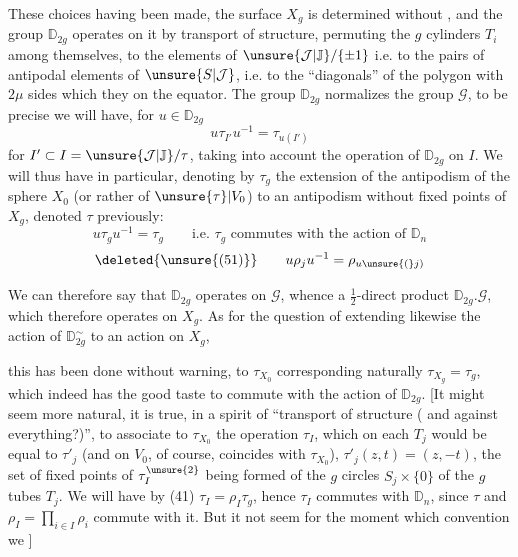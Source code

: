 These choices having been made, the surface $X_g$ is determined without
, and the group $\mathbb D_{2g}$ operates on it by transport of
structure, permuting the $g$ cylinders $T_i$ among themselves,
 to the elements of
$\unsure{\mathcal J|\mathbb J}/\{\pm1\}$ i.e.
to the pairs of antipodal elements of $\unsure{S|\mathcal J}$,
i.e. to the ``diagonals'' of the polygon with $2\mu$ sides
which they 
on the equator. The group $\mathbb D_{2g}$ normalizes
 the group $\mathcal G$, to be precise
we will have, for $u\in\mathbb D_{2g}$
\[
\tag{49}
u\tau_{I'}u^{-1}=\tau_{u(I')}
\]
for $I'\subset I=\unsure{\mathcal J|\mathbb J}/\tau$, taking into account
the operation of $\mathbb D_{2g}$ on $I$. We will thus have in
particular, denoting by $\tau_g$\inserted{$=\tau_\varnothing$}
the extension  of the antipodism of the sphere $X_0$
(or rather of $\unsure{\tau}\vert V_0$) to an antipodism
without fixed points of $X_g$, denoted $\tau$ previously:
\[
\tag{50}
u\tau_g u^{-1}=\tau_g
\qquad\text{i.e. $\tau_g$ commutes with the action of $\mathbb D_n$}
\]
\[
\deleted{\unsure{(51)}}\qquad
u\rho_j u^{-1}=\rho_{u\unsure{(}j)}
\]

We can therefore say that $\mathbb D_{2g}$ operates on $\mathcal G$,
whence a $\frac12$-direct product $\mathbb D_{2g}.\mathcal G$,
which therefore operates on $X_g$.
As for the question of extending likewise
the action  of $\mathbb D_{2g}^\sim$
  to an action on $X_g$,



this has been done without warning, to $\tau_{X_0}$ corresponding
naturally $\tau_{X_g}=\tau_g$, which indeed has the good taste
to commute with the action of $\mathbb D_{2g}$.
[It might seem more natural, it is true, in a
spirit of ``transport of structure ( and against
everything?)'', to associate to $\tau_{X_0}$ the operation
$\tau_I$, which on
each $T_j$ would be equal to $\tau'_j$
(and on $V_0$, of course, coincides with $\tau_{X_0}$),
$\tau'_j(z,t)=(z,-t)$,
 the set of fixed points of $\tau_I^{\unsure{2}}$
being formed of the $g$  circles $S_j\times\{0\}$
of the $g$ tubes $T_j$. We will have by (41)
$\tau_I=\rho_I\tau_g$, hence $\tau_I$ commutes
 with $\mathbb D_n$, since $\tau$ and
$\rho_I=\prod_{i\in I}\rho_i$ commute with it.
But it  not seem  for the moment
which convention we ]

